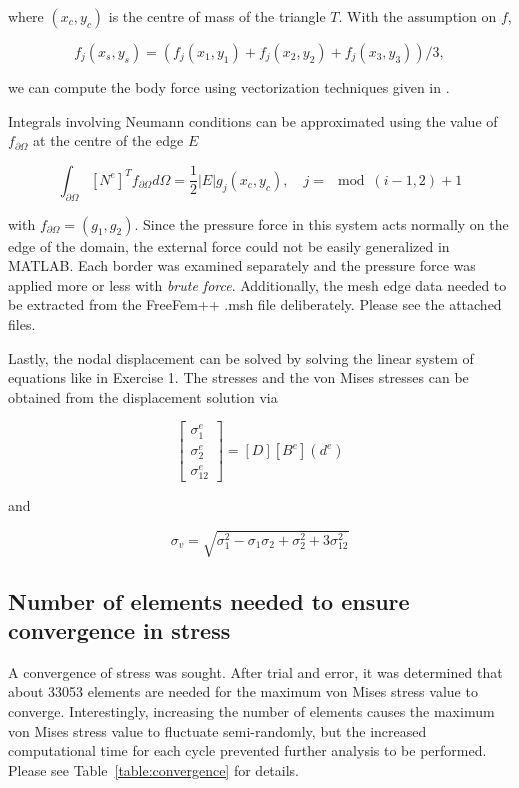 \documentclass[11pt,fleqn]{article}
\begin{document}
where $(x_c,y_c)$ is the centre of mass of the triangle $T$. With the assumption on $f$,

\begin{equation}
	f_j(x_s, y_s) = (f_j(x_1, y_1) + f_j(x_2, y_2) + f_j(x_3, y_3))/3,
\end{equation}

we can compute the body force using vectorization techniques given in \cite{koko2007vectorized}.

Integrals involving Neumann conditions can be approximated using the value of $f_{\partial \Omega}$ at the centre of the edge $E$

\begin{equation}
	\int_{\partial \Omega} [N^e]^T f_{\partial \Omega} d\Omega = \frac{1}{2} |E| g_j(x_c,y_c), \quad j=\mod(i-1,2)+1
\end{equation}

with $f_{\partial\Omega} = (g_1, g_2)$. Since the pressure force in this system acts normally on the edge of the domain, the external force could not be easily generalized in MATLAB. Each border was examined separately and the pressure force was applied more or less with \emph{brute force}. Additionally, the mesh edge data needed to be extracted from the FreeFem++ .msh file deliberately. Please see the attached files.

Lastly, the nodal displacement can be solved by solving the linear system of equations like in Exercise 1.  The stresses and the von Mises stresses can be obtained from the displacement solution via

\begin{equation}
\left[
\begin{array}{c}
	\sigma_{1}^e \\
	\sigma_{2}^e \\
	\sigma_{12}^e
\end{array}
\right]
= [D][B^e](d^e)
\end{equation}

and

\begin{equation}
	\sigma_v = \sqrt{\sigma_1^2- \sigma_1\sigma_2+ \sigma_2^2+3\sigma_{12}^2}
\end{equation}

\subsection{Number of elements needed to ensure convergence in stress} 

A convergence of stress was sought. After trial and error, it was determined that about 33053 elements are needed for the maximum von Mises stress value to converge. Interestingly, increasing the number of elements causes the maximum von Mises stress value to fluctuate semi-randomly, but the increased computational time for each cycle prevented further analysis to be performed. Please see Table~\ref{table:convergence} for details.
\end{document}
